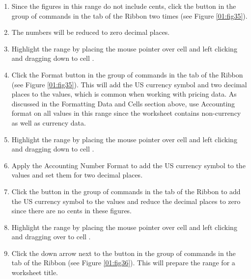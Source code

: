 \begin{enumerate}[resume]
	\item Since the figures in this range do not include cents, click the  button in the  group of commands in the  tab of the Ribbon two times (see Figure \ref{01:fig35}).
	\item The numbers will be reduced to zero decimal places.
	\item Highlight the range  by placing the mouse pointer over cell  and left clicking and dragging down to cell .
	\item Click the  Format button in the  group of commands in the  tab of the Ribbon (see Figure \ref{01:fig35}). This will add the US currency symbol and two decimal places to the values, which is common when working with pricing data. As discussed in the Formatting Data and Cells section above, use Accounting format on all values in this range since the worksheet contains non-currency as well as currency data.
	\item Highlight the range  by placing the mouse pointer over cell  and left clicking and dragging down to cell .
	\item Apply the Accounting Number Format to add the US currency symbol to the values and set them for two decimal places.
	\item Click the  button in the  group of commands in the  tab of the Ribbon to add the US currency symbol to the values and reduce the decimal places to zero since there are no cents in these figures.
	\item Highlight the range  by placing the mouse pointer over cell  and left clicking and dragging over to cell .
	\item Click the down arrow next to the  button in the  group of commands in the  tab of the Ribbon (see Figure \ref{01:fig36}). This will prepare the range for a worksheet title.
\end{enumerate}


